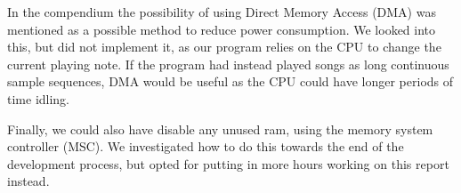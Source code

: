 In the compendium the possibility of using Direct Memory Access (DMA) was mentioned as a possible method to reduce power consumption. We looked into this, but did not implement it, as our program relies on the CPU to change the current playing note. If the program had instead played songs as long continuous sample sequences, DMA would be useful as the CPU could have longer periods of time idling.

Finally, we could also have disable any unused ram, using the memory system controller (MSC). We investigated how to do this towards the end of the development process, but opted for putting in more hours working on this report instead.
